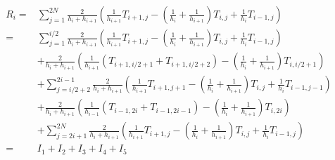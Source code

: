 \documentclass{ctexart}
\begin{document}
\begin{equation}
    \begin{aligned}
        R_i
        = & \sum_{j=1}^{2N} \frac{2}{h_i + h_{i+1}}
        \left( \frac{1}{h_{i+1}} T_{i+1, j}
        - (\frac{1}{h_{i}}+\frac{1}{h_{i+1}}) T_{i,j}
        +  \frac{1}{h_{i}} T_{i-1, j} \right)                     \\
        = & \sum_{j=1}^{i/2} \frac{2}{h_i + h_{i+1}}
        \left( \frac{1}{h_{i+1}} T_{i+1, j}
        - (\frac{1}{h_{i}}+\frac{1}{h_{i+1}}) T_{i,j}
        +  \frac{1}{h_{i}} T_{i-1, j} \right)                     \\
          & + \frac{2}{h_i + h_{i+1}}
        \left( \frac{1}{h_{i+1}} (T_{i+1, i/2+1} +  T_{i+1, i/2+2})
        - (\frac{1}{h_{i}}+\frac{1}{h_{i+1}}) T_{i,i/2+1} \right) \\
          & + \sum_{j=i/2+2}^{2i-1} \frac{2}{h_i + h_{i+1}}
        \left( \frac{1}{h_{i+1}} T_{i+1, j+1}
        - (\frac{1}{h_{i}}+\frac{1}{h_{i+1}}) T_{i,j}
        +  \frac{1}{h_{i}} T_{i-1, j-1} \right)                   \\
          & + \frac{2}{h_i + h_{i+1}}
        \left( \frac{1}{h_{i-1}} (T_{i-1, 2i} +  T_{i-1, 2i-1})
        - (\frac{1}{h_{i}}+\frac{1}{h_{i+1}}) T_{i,2i} \right)    \\
          & + \sum_{j=2i+1}^{2N} \frac{2}{h_i + h_{i+1}}
        \left( \frac{1}{h_{i+1}} T_{i+1, j}
        - (\frac{1}{h_{i}}+\frac{1}{h_{i+1}}) T_{i,j}
        +  \frac{1}{h_{i}} T_{i-1, j} \right)                     \\
        = & I_1 + I_2 + I_3 + I_4 + I_5
    \end{aligned}
\end{equation}
\end{document}
